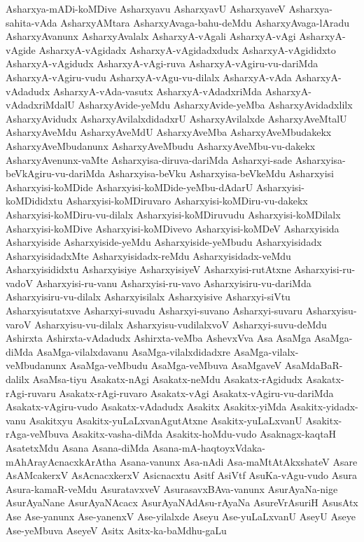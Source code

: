 {Asharxya-mADi-koMDive
Asharxyavu
AsharxyavU
AsharxyaveV
Asharxya-sahita-vAda
AsharxyAMtara
AsharxyAvaga-bahu-deMdu
AsharxyAvaga-lAradu
AsharxyAvanunx
AsharxyAvalalx
AsharxyA-vAgali
AsharxyA-vAgi
AsharxyA-vAgide
AsharxyA-vAgidadx
AsharxyA-vAgidadxdudx
AsharxyA-vAgididxto
AsharxyA-vAgidudx
AsharxyA-vAgi-ruva
AsharxyA-vAgiru-vu-dariMda
AsharxyA-vAgiru-vudu
AsharxyA-vAgu-vu-dilalx
AsharxyA-vAda
AsharxyA-vAdadudx
AsharxyA-vAda-vasutx
AsharxyA-vAdadxriMda
AsharxyA-vAdadxriMdalU
AsharxyAvide-yeMdu
AsharxyAvide-yeMba
AsharxyAvidadxlilx
AsharxyAvidudx
AsharxyAvilalxdidadxrU
AsharxyAvilalxde
AsharxyAveMtalU
AsharxyAveMdu
AsharxyAveMdU
AsharxyAveMba
AsharxyAveMbudakekx
AsharxyAveMbudanunx
AsharxyAveMbudu
AsharxyAveMbu-vu-dakekx
AsharxyAvenunx-vaMte
Asharxyisa-diruva-dariMda
Asharxyi-sade
Asharxyisa-beVkAgiru-vu-dariMda
Asharxyisa-beVku
Asharxyisa-beVkeMdu
Asharxyisi
Asharxyisi-koMDide
Asharxyisi-koMDide-yeMbu-dAdarU
Asharxyisi-koMDididxtu
Asharxyisi-koMDiruvaro
Asharxyisi-koMDiru-vu-dakekx
Asharxyisi-koMDiru-vu-dilalx
Asharxyisi-koMDiruvudu
Asharxyisi-koMDilalx
Asharxyisi-koMDive
Asharxyisi-koMDivevo
Asharxyisi-koMDeV
Asharxyisida
Asharxyiside
Asharxyiside-yeMdu
Asharxyiside-yeMbudu
Asharxyisidadx
AsharxyisidadxMte
Asharxyisidadx-reMdu
Asharxyisidadx-veMdu
Asharxyisididxtu
Asharxyisiye
AsharxyisiyeV
Asharxyisi-rutAtxne
Asharxyisi-ru-vadoV
Asharxyisi-ru-vanu
Asharxyisi-ru-vavo
Asharxyisiru-vu-dariMda
Asharxyisiru-vu-dilalx
Asharxyisilalx
Asharxyisive
Asharxyi-siVtu
Asharxyisutatxve
Asharxyi-suvadu
Asharxyi-suvano
Asharxyi-suvaru
Asharxyisu-varoV
Asharxyisu-vu-dilalx
Asharxyisu-vudilalxvoV
Asharxyi-suvu-deMdu
Ashirxta
Ashirxta-vAdadudx
Ashirxta-veMba
AshevxVva
Asa
AsaMga
AsaMga-diMda
AsaMga-vilalxdavanu
AsaMga-vilalxdidadxre
AsaMga-vilalx-veMbudanunx
AsaMga-veMbudu
AsaMga-veMbuva
AsaMgaveV
AsaMdaBaR-dalilx
AsaMsa-tiyu
Asakatx-nAgi
Asakatx-neMdu
Asakatx-rAgidudx
Asakatx-rAgi-ruvaru
Asakatx-rAgi-ruvaro
Asakatx-vAgi
Asakatx-vAgiru-vu-dariMda
Asakatx-vAgiru-vudo
Asakatx-vAdadudx
Asakitx
Asakitx-yiMda
Asakitx-yidadx-vanu
Asakitxyu
Asakitx-yuLaLxvanAgutAtxne
Asakitx-yuLaLxvanU
Asakitx-rAga-veMbuva
Asakitx-vasha-diMda
Asakitx-hoMdu-vudo
Asaknagx-kaqtaH
AsatetxMdu
Asana
Asana-diMda
Asana-mA-haqtoyxVdaka-mAhArayAcnacxkArAtha
Asana-vanunx
Asa-nAdi
Asa-maMtAtAkxshateV
Asare
AsAMcakerxV
AsAcnacxkerxV
Asicnacxtu
Asitf
AsiVtf
AsuKa-vAgu-vudo
Asura
Asura-kamaR-veMdu
AsuratavxveV
AsurasavxBAva-vanunx
AsurAyaNa-nige
AsurAyaNane
AsurAyaNAcacx
AsurAyaNAdAsu-rAyaNa
AsureVrAsuriH
AsusAtx
Ase
Ase-yanunx
Ase-yanenxV
Ase-yilalxde
Aseyu
Ase-yuLaLxvanU
AseyU
Aseye
Ase-yeMbuva
AseyeV
Asitx
Asitx-ka-baMdhu-gaLu
}
